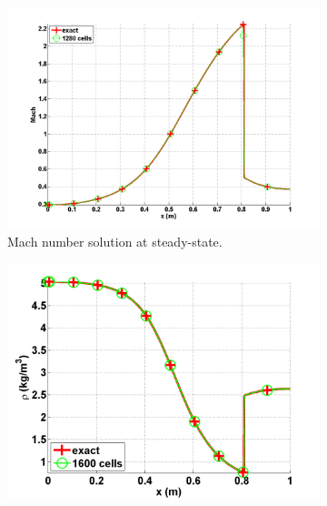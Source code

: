 \documentclass[preprint,10pt]{elsarticle}
\begin{document}
\begin{figure}[H]
        \centering
        \begin{subfigure}[b]{0.495\textwidth}
                \centering
                \includegraphics[width=\textwidth]{vapor_mach_numerical_and_exact_1280.png}
                \caption{Mach number solution at steady-state.}
                \label{fig:1d_nozzle_vap_vel}
        \end{subfigure}%
        \begin{subfigure}[b]{0.495\textwidth}
                \centering
                \includegraphics[width=\textwidth]{vapor_density_numerical_and_exact_1600.png}

\end{subfigure}
\end{figure}
\end{document}
